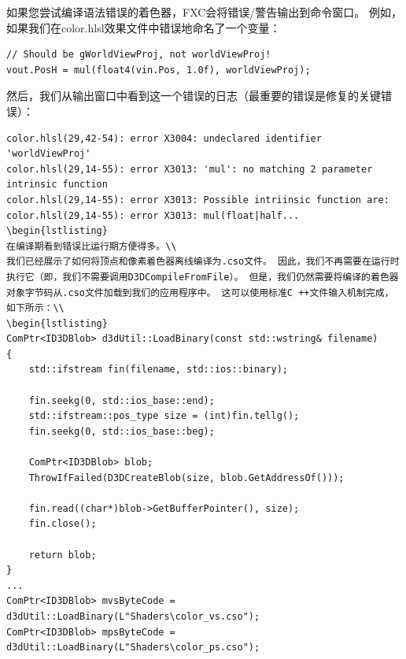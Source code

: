 \documentclass[11pt,a4paper,oldfontcommands]{memoir}
\begin{document}
{\begin{flushleft}
\begin{tabular}{|p{5em}|p{35em}|}
\hline
\end{tabular}
如果您尝试编译语法错误的着色器，FXC会将错误/警告输出到命令窗口。 例如，如果我们在color.hlsl效果文件中错误地命名了一个变量：\\
\begin{lstlisting}
// Should be gWorldViewProj, not worldViewProj!
vout.PosH = mul(float4(vin.Pos, 1.0f), worldViewProj);
\end{lstlisting}
然后，我们从输出窗口中看到这一个错误的日志（最重要的错误是修复的关键错误）：\\
\begin{lstlisting}
color.hlsl(29,42-54): error X3004: undeclared identifier 'worldViewProj'
color.hlsl(29,14-55): error X3013: 'mul': no matching 2 parameter intrinsic function
color.hlsl(29,14-55): error X3013: Possible intriinsic function are:
color.hlsl(29,14-55): error X3013: mul(float|half...
\begin{lstlisting}
在编译期看到错误比运行期方便得多。\\
我们已经展示了如何将顶点和像素着色器离线编译为.cso文件。 因此，我们不再需要在运行时执行它（即，我们不需要调用D3DCompileFromFile）。 但是，我们仍然需要将编译的着色器对象字节码从.cso文件加载到我们的应用程序中。 这可以使用标准C ++文件输入机制完成，如下所示：\\
\begin{lstlisting}
ComPtr<ID3DBlob> d3dUtil::LoadBinary(const std::wstring& filename)
{
    std::ifstream fin(filename, std::ios::binary);
    
    fin.seekg(0, std::ios_base::end);
    std::ifstream::pos_type size = (int)fin.tellg();
    fin.seekg(0, std::ios_base::beg);
    
    ComPtr<ID3DBlob> blob;
    ThrowIfFailed(D3DCreateBlob(size, blob.GetAddressOf()));
    
    fin.read((char*)blob->GetBufferPointer(), size);
    fin.close();

    return blob;
}
...
ComPtr<ID3DBlob> mvsByteCode = d3dUtil::LoadBinary(L"Shaders\color_vs.cso");
ComPtr<ID3DBlob> mpsByteCode = d3dUtil::LoadBinary(L"Shaders\color_ps.cso");
\end{lstlisting}
\end{flushleft}

}
\end{document}
